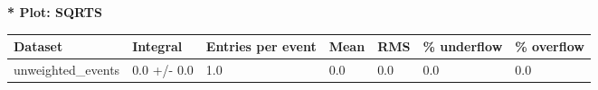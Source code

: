 \documentclass[a4paper, 10pt]{article}
\begin{document}
\textbf{* Plot: SQRTS}\\
   \begin{table}[H]
  \begin{center}
    \begin{tabular}{|m{23.0mm}|m{23.0mm}|m{18.0mm}|m{19.0mm}|m{19.0mm}|m{19.0mm}|m{19.0mm}|}
      \hline
      {\cellcolor{yellow}         Dataset}& {\cellcolor{yellow}         Integral}& {\cellcolor{yellow}         Entries per event}& {\cellcolor{yellow}         Mean}& {\cellcolor{yellow}         RMS}& {\cellcolor{yellow}         \% underflow}& {\cellcolor{yellow}         \% overflow}\\
      \hline
      {\cellcolor{white}         unweighted\_events}& {\cellcolor{white}         0.0 +/\-- 0.0}& {\cellcolor{white}         1.0}& {\cellcolor{white}         0.0}& {\cellcolor{white}         0.0}& {\cellcolor{green}         0.0}& {\cellcolor{green}         0.0}\\
\hline
    \end{tabular}
  \end{center}
\end{table}
\end{document}

